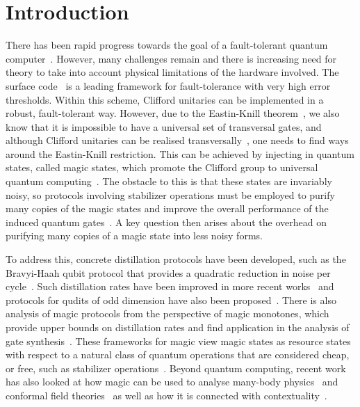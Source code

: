 \documentclass[pra,
aps,
twocolumn,
superscriptaddress,
groupedaddress,
nofootinbib,
reprint
]{revtex4-1}
\begin{document}
\section{Introduction}
\label{sec:intro}

There has been rapid progress towards the goal of a fault-tolerant quantum computer~\cite{campbell_roads_2017, cit:raussendorf, Raussendorf_2013, Nickerson_2014, Nikahd_2017, chao_2018, lin_pieceable_2020, Lin_2020, Bourassa_2021}. However, many challenges remain and there is increasing need for theory to take into account physical limitations of the hardware involved. The surface code~\cite{Bravyi_1998, Freedman_2001, Dennis_2002, Raussendorf_2007} is a leading framework for fault-tolerance with very high error thresholds. Within this scheme, Clifford unitaries can be implemented in a robust, fault-tolerant way. However, due to the Eastin-Knill theorem~\cite{Eastin_2009}, we also know that it is impossible to have a universal set of transversal gates, and although Clifford unitaries can be realised transversally~\cite{Calderbank_1996, Steane_1996}, one needs to find ways around the Eastin-Knill restriction. This can be achieved by injecting in quantum states, called magic states, which promote the Clifford group to universal quantum computing~\cite{cit:bravyi}. The obstacle to this is that these states are invariably noisy, so protocols involving stabilizer operations must be employed to purify many copies of the magic states and improve the overall performance of the induced quantum gates~\cite{cit:bravyi, Jones_2013, Ogorman_2017}. A key question then arises about the overhead on purifying many copies of a magic state into less noisy forms. 

To address this, concrete distillation protocols have been developed, such as the Bravyi-Haah qubit protocol that provides a quadratic reduction in noise per cycle~\cite{Bravyi2012}. Such distillation rates have been improved in more recent works~\cite{Jones_2013, haah2017magic, Hastings2018, Litinski_2019} and protocols for qudits of odd dimension have also been proposed~\cite{CampbellAnwar_2012, Anwar_2012, Dawkins_2015, Krishna2019, cit:prakash}. There is also analysis of magic protocols from the perspective of magic monotones, which provide upper bounds on distillation rates and find application in the analysis of gate synthesis~\cite{Campbell_2017, Howard_2017, Prakash_2018, Seddon_2021,leone2021renyi}. These frameworks for magic view magic states as resource states with respect to a natural class of quantum operations that are considered cheap, or free, such as stabilizer operations~\cite{Gour_2019, cit:ahmadi, cit:seddon, Wang_2019}. Beyond quantum computing, recent work has also looked at how magic can be used to analyse many-body physics~\cite{Sarkar_2020} and conformal field theories~\cite{White_2021} as well as how it is connected with contextuality~\cite{Vega_2017, cit:howard2, Zurel_2020, Okay_2021}.
\end{document}
